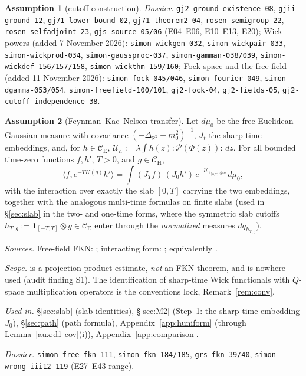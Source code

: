 \documentclass[11pt,a4paper]{article}
\theoremstyle{plain}
\theoremstyle{definition}
\newtheorem{assumption}{Assumption}
\theoremstyle{plain}
\theoremstyle{definition}
\newcommand{\R}{\mathbb{R}}
\newcommand{\CE}{\mathcal{C}_{\mathrm E}}
\newcommand{\CH}{\mathcal{C}_{\mathrm H}}
\newcommand{\ip}[2]{\langle #1,#2\rangle}
\begin{document}
\begin{assumption}[cutoff construction]
{\raggedright\emph{Dossier.} \texttt{gj2-ground-existence-08}, \texttt{gjii-ground-12},
\texttt{gj71-lower-bound-02}, \texttt{gj71-theorem2-04}, \texttt{rosen-semigroup-22},
\texttt{rosen-selfadjoint-23}, \texttt{gjs-source-05/06} (E04--E06, E10--E13, E20); Wick
powers (added 7 November 2026): \texttt{simon-wickgen-032}, \texttt{simon-wickpair-033},
\texttt{simon-wickprod-034}, \texttt{simon-gaussproc-037}, \texttt{simon-gamman-038/039},
\texttt{simon-wickdef-156/157/158}, \texttt{simon-wickthm-159/160}; Fock space and the free
field (added 11 November 2026): \texttt{simon-fock-045/046}, \texttt{simon-fourier-049},
\texttt{simon-dgamma-053/054}, \texttt{simon-freefield-100/101}, \texttt{gj2-fock-04},
\texttt{gj2-fields-05}, \texttt{gj2-cutoff-independence-38}.\par}
\end{assumption}

\begin{assumption}[Feynman--Kac--Nelson transfer]\label{A:fkn}
Let $d\mu_0$ be the free Euclidean Gaussian measure with covariance
$(-\Delta_{\R^2}+m_0^2)^{-1}$, $J_t$ the sharp-time embeddings, and, for $h\in\CE$,
$\mathcal U_h:=\lambda\int h(z){:}\mathscr P(\Phi(z)){:}\,dz$. For all bounded time-zero
functions $f,h'$, $T>0$, and $g\in\CH$,
\[
 \ip{f}{e^{-TK(g)}h'}
 =\int\overline{(J_Tf)}\,(J_0h')\,e^{-\mathcal U_{\mathbf 1_{[0,T]}\otimes g}}\,d\mu_0 ,
\]
with the interaction over exactly the slab $[0,T]$ carrying the two embeddings, together
with the analogous multi-time formulas on finite slabs (used in \S\ref{sec:slab} in the
two- and one-time forms, where the symmetric slab cutoffs
$h_{T,g}:=\mathbf 1_{[-T,T]}\otimes g\in\CE$ enter through the \emph{normalized}
measures $dq_{h_{T,g}}$).

\emph{Sources.} Free-field FKN: \cite[Thm.~III.6]{SimonBook}; interacting form:
\cite[Cor.~V.14, Thm.~V.15]{SimonBook}; equivalently \cite[Thms.~II.14, II.16]{GRS75}.

\emph{Scope.} \cite[Thm.~III.12]{SimonBook} is a projection-product estimate, %
\emph{not} an FKN theorem, and is nowhere used (audit finding S1).
The identification of sharp-time Wick functionals with $Q$-space multiplication operators is
the conventions lock, Remark~\ref{rem:conv}.

\emph{Used in.} \S\ref{sec:slab} (slab identities), \S\ref{sec:M2} (Step~1: the sharp-time
embedding $J_0$), \S\ref{sec:path} (path formula), Appendix~\ref{app:huniform} (through
Lemma~\ref{aux:d1-cov}(i)), Appendix~\ref{app:comparison}.

{\raggedright\emph{Dossier.} \texttt{simon-free-fkn-111}, \texttt{simon-fkn-184/185},
\texttt{grs-fkn-39/40}, \texttt{simon-wrong-iii12-119} (E27--E43 range).\par}
\end{assumption}
\end{document}
